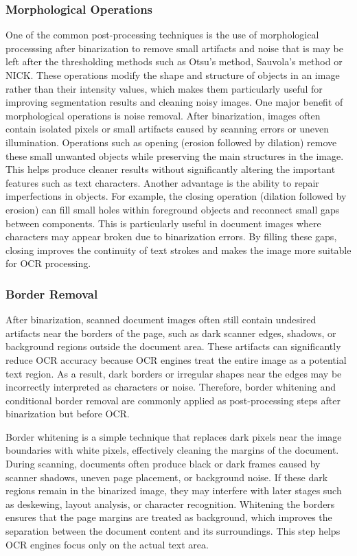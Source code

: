 \subsubsection{Morphological Operations}

One of the common post-processing techniques is the use of morphological processsing after binarization to remove small artifacts and noise that is may be left after the thresholding methods such as Otsu's method, Sauvola's method or NICK. These operations modify the shape and structure of objects in an image rather than their intensity values, which makes them particularly useful for improving segmentation results and cleaning noisy images. One major benefit of morphological operations is noise removal. After binarization, images often contain isolated pixels or small artifacts caused by scanning errors or uneven illumination. Operations such as opening (erosion followed by dilation) remove these small unwanted objects while preserving the main structures in the image. This helps produce cleaner results without significantly altering the important features such as text characters. Another advantage is the ability to repair imperfections in objects. For example, the closing operation (dilation followed by erosion) can fill small holes within foreground objects and reconnect small gaps between components. This is particularly useful in document images where characters may appear broken due to binarization errors. By filling these gaps, closing improves the continuity of text strokes and makes the image more suitable for OCR processing. 

\subsubsection{Border Removal}

After binarization, scanned document images often still contain undesired artifacts near the borders of the page, such as dark scanner edges, shadows, or background regions outside the document area. These artifacts can significantly reduce OCR accuracy because OCR engines treat the entire image as a potential text region. As a result, dark borders or irregular shapes near the edges may be incorrectly interpreted as characters or noise. Therefore, border whitening and conditional border removal are commonly applied as post-processing steps after binarization but before OCR.

Border whitening is a simple technique that replaces dark pixels near the image boundaries with white pixels, effectively cleaning the margins of the document. During scanning, documents often produce black or dark frames caused by scanner shadows, uneven page placement, or background noise. If these dark regions remain in the binarized image, they may interfere with later stages such as deskewing, layout analysis, or character recognition. Whitening the borders ensures that the page margins are treated as background, which improves the separation between the document content and its surroundings. This step helps OCR engines focus only on the actual text area.

